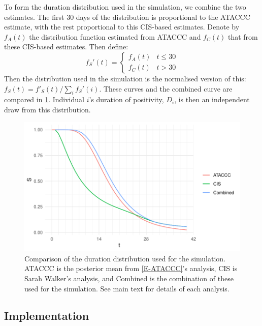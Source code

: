 \documentclass[thesis.tex]{subfiles}
\begin{document}
To form the duration distribution used in the simulation, we combine the two estimates.
The first 30 days of the distribution is proportional to the ATACCC estimate, with the rest proportional to this CIS-based estimates.
Denote by $f_A(t)$ the distribution function estimated from ATACCC and $f_C(t)$ that from these CIS-based estimates.
Then define:
$$
f_S'(t) = \begin{cases}
	f_A(t) &t \leq 30 \\
	f_C(t) &t > 30
\end{cases}
$$
Then the distribution used in the simulation is the normalised version of this: $f_S(t) = f'_S(t)/\sum_i f_S'(i)$.
These curves and the combined curve are compared in \cref{perf-test:fig:duration-dist}.
Individual $i$'s duration of positivity, $D_i$, is then an independent draw from this distribution.
\begin{figure}
  \centering \includegraphics{cis-perfect-testing/input-duration-dists}
  \caption[Comparison of duration distributions]{Comparison of the duration distribution used for the simulation. ATACCC is the posterior mean from \cref{E-ATACCC}'s analysis, CIS is Sarah Walker's analysis, and Combined is the combination of these used for the simulation. See main text for details of each analysis. \label{perf-test:fig:duration-dist}}
\end{figure}

\subsection{Implementation}
\end{document}
